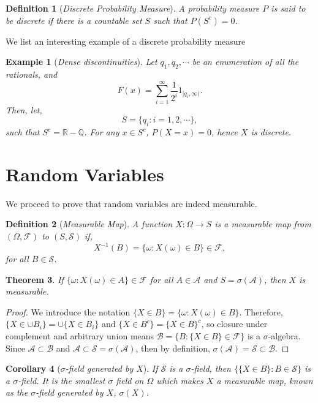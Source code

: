 \documentclass[10pt,a4paper]{article}
\newtheorem{theorem}{Theorem}[section]
\newtheorem{example}{Example}[section]
\newtheorem{corollary}[theorem]{Corollary}
\newtheorem{definition}[theorem]{Definition}
\numberwithin{equation}{subsection}
\begin{document}
\begin{definition}[\emph{Discrete Probability Measure}]
A probability measure $P$ is said to be discrete if there is a 
countable set $S$ such that $P(S^c) = 0$.
\end{definition}

We list an interesting example of a discrete probability measure
\begin{example}[\emph{Dense discontinuities}]
	Let $q_1, q_2, \cdots$ be an enumeration of all the rationals, and
	\[
		F(x) = \sum_{i=1}^\infty \frac{1}{2^i} 1_{[q_i, \infty)}. 
	\]
	Then, let,
	\[
		S = \{q_i: i = 1, 2, \cdots\}, 
	\]
	such that $S^c = \mathbb{R} - \mathbb{Q}$. For any $x \in S^c$, 
	$P(X = x) = 0$, hence $X$ is discrete.
\end{example}


\section{Random Variables}

We proceed to prove that random variables are indeed measurable. 

\begin{definition}[\emph{Measurable Map}]
	A function $X: \Omega \rightarrow S$ is a measurable map from $(\Omega, \mathcal{F})$ to
	$(S, \mathcal{S})$ if,
	\[
		X^{-1}(B) = \{\omega: X(\omega) \in B\} \in \mathcal{F},
	\]
	for all $B \in \mathcal{S}$. 
\end{definition}

\begin{theorem}
	If $\{\omega: X(\omega) \in A\} \in \mathcal{F}$ for all $A \in \mathcal{A}$ and
	$S = \sigma(\mathcal{A})$, then $X$ is measurable. 
\end{theorem}

\begin{proof}
	We introduce the notation $\{X \in B \} = \{\omega: X(\omega) \in B\}$. Therefore,
	$\{X \in \cup B_i\} = \cup \{X \in B_i\}$ and $\{X \in B^c\} = \{X \in B\}^c$,
	so closure under complement and arbitrary union means $\mathcal{B} = 
	\{B:\{X \in B\} \in \mathcal{F}\}$ is a $\sigma$-algebra. Since $\mathcal{A} \subset \mathcal{B}$ and $\mathcal{A} \subset \mathcal{S} = \sigma(\mathcal{A})$, then
	by definition, $\sigma(\mathcal{A}) = \mathcal{S} \subset \mathcal{B}$. 
\end{proof}


\begin{corollary}[\emph{$\sigma$-field generated by $X$}]
	If $\mathcal{S}$ is a $\sigma$-field, then $\{\{X \in B\} : B \in \mathcal{S}\}$
	is a $\sigma$-field. It is the smallest $\sigma$ field on $\Omega$ which makes $X$ a 
	measurable map, known as the $\sigma$-field generated by $X$, $\sigma(X)$. 
\end{corollary}
\end{document}
